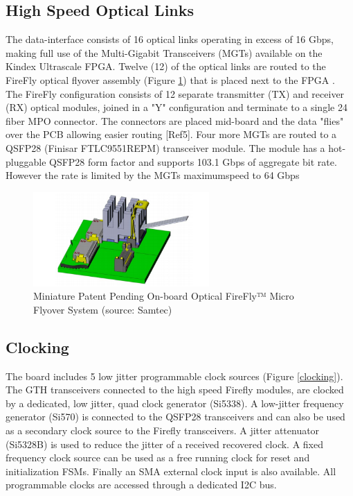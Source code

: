 \documentclass[a4paper]{PoS}
\begin{document}
\subsection{High Speed Optical Links}
The data-interface consists of 16 optical links operating in excess of 16 Gbps, making full use of the Multi-Gigabit Transceivers (MGTs) available on the Kindex Ultrascale FPGA. Twelve (12) of the optical links are routed to the FireFly optical flyover assembly (Figure \ref{firefly}) that is placed next to the FPGA \cite{zbinden2018connector}. The FireFly configuration consists of 12 separate transmitter (TX) and receiver (RX) optical modules, joined in a "Y" configuration and terminate to a single 24 fiber MPO connector. The connectors are placed mid-board and the data "flies" over the PCB allowing easier routing [Ref5]. Four more MGTs are routed to a QSFP28 (Finisar FTLC9551REPM) transceiver module. The module has a hot-pluggable QSFP28 form factor and supports 103.1 Gbps of aggregate bit rate. However the rate is limited by the MGTs maximumspeed to 64 Gbps

\begin{figure}
\centering
\includegraphics[width=0.6\textwidth]{firefly.png}
\caption{Miniature Patent Pending On-board Optical FireFly™ Micro
Flyover System (source: Samtec) }
\label{firefly}
\end{figure}


\subsection{Clocking}
The board includes 5 low jitter programmable clock sources (Figure \ref{clocking}). The GTH transceivers connected to the high speed Firefly modules, are clocked by a dedicated, low jitter, quad clock generator (Si5338). A low-jitter frequency generator (Si570) is connected to the QSFP28 transceivers and can also be used as a secondary clock source to the Firefly transceivers. A jitter attenuator (Si5328B) is used to reduce the jitter of a received recovered clock. A fixed frequency clock source can be used as a free running clock for reset and initialization FSMs. Finally an SMA external clock input is also available. All programmable clocks are accessed through a dedicated I2C bus.
\end{document}
